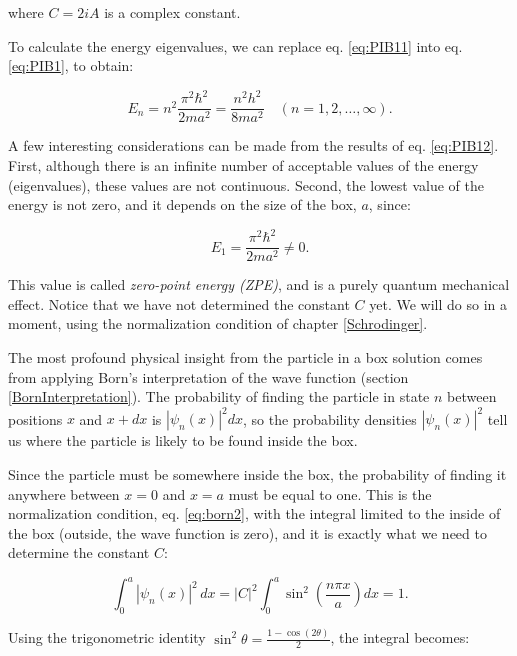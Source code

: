 \documentclass[
  english,
  9pt,
]{extbook}
\theoremstyle{definition}
\theoremstyle{definition}
\theoremstyle{definition}
\theoremstyle{definition}
\theoremstyle{remark}
\begin{document}
where \(C = 2iA\) is a complex constant.

To calculate the energy eigenvalues, we can replace eq. \eqref{eq:PIB11} into eq. \eqref{eq:PIB1}, to obtain:

\begin{equation}
E_n = n^2 \frac{\pi^2 \hbar^2 }{2 m a^2} = \frac{n^2 h^2}{8 m a^2} \quad (n=1,2,\ldots,\infty).
\label{eq:PIB12}
\end{equation}

A few interesting considerations can be made from the results of eq. \eqref{eq:PIB12}. First, although there is an infinite number of acceptable values of the energy (eigenvalues), these values are not continuous. Second, the lowest value of the energy is not zero, and it depends on the size of the box, \(a\), since:

\begin{equation}
E_1 = \frac{\pi^2 \hbar^2 }{2 m a^2}\neq 0.
\label{eq:PIB13}
\end{equation}

This value is called \emph{zero-point energy (ZPE)}, and is a purely quantum mechanical effect. Notice that we have not determined the constant \(C\) yet. We will do so in a moment, using the normalization condition of chapter \ref{Schrodinger}.

The most profound physical insight from the particle in a box solution comes from applying Born's interpretation of the wave function (section \ref{BornInterpretation}). The probability of finding the particle in state \(n\) between positions \(x\) and \(x+dx\) is \(|\psi_n(x)|^2 dx\), so the probability densities \(|\psi_n(x)|^2\) tell us where the particle is likely to be found inside the box.

Since the particle must be somewhere inside the box, the probability of finding it anywhere between \(x=0\) and \(x=a\) must be equal to one. This is the normalization condition, eq. \eqref{eq:born2}, with the integral limited to the inside of the box (outside, the wave function is zero), and it is exactly what we need to determine the constant \(C\):

\begin{equation}
\int_0^a |\psi_n(x)|^2\, dx = |C|^2 \int_0^a \sin^2\left(\frac{n\pi x}{a}\right) dx = 1.
\label{eq:PIBnorm1}
\end{equation}

Using the trigonometric identity \(\sin^2\theta = \frac{1 - \cos(2\theta)}{2}\), the integral becomes:
\end{document}
